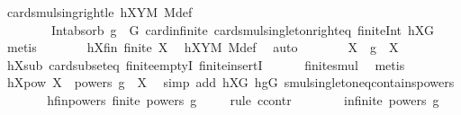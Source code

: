 \begin{isabellebody}
\ card{\isacharunderscore}{\kern0pt}smul{\isacharunderscore}{\kern0pt}sing{\isacharunderscore}{\kern0pt}right{\isacharunderscore}{\kern0pt}le\ hXYM\ M{\isacharunderscore}{\kern0pt}def\ \isanewline
\ \ \ \ \ \ \ \ Int{\isacharunderscore}{\kern0pt}absorb{}\ {\isacartoucheopen}g\ {\isasymin}\ G{\isacartoucheclose}\ card{\isachardot}{\kern0pt}infinite\ card{\isacharunderscore}{\kern0pt}smul{\isacharunderscore}{\kern0pt}singleton{\isacharunderscore}{\kern0pt}right{\isacharunderscore}{\kern0pt}eq\ finite{\isacharunderscore}{\kern0pt}Int\ hXG\ \isamarkupfalse%
\ metis\isanewline
\ \ \ \ \isamarkupfalse%
\ \isamarkupfalse%
\ hXfin{\isacharcolon}{\kern0pt}\ {\isachardoublequoteopen}finite\ X{\isachardoublequoteclose}\ \isamarkupfalse%
\ hXYM\ M{\isacharunderscore}{\kern0pt}def\ \isamarkupfalse%
\ auto\isanewline
\ \ \ \ \isamarkupfalse%
\ \isamarkupfalse%
\ {\isachardoublequoteopen}X\ {\isasymcdots}\ {\isacharbraceleft}{\kern0pt}g{\isacharbraceright}{\kern0pt}\ {\isacharequal}{\kern0pt}\ X{\isachardoublequoteclose}\ \isamarkupfalse%
\ hXsub\ card{\isacharunderscore}{\kern0pt}subset{\isacharunderscore}{\kern0pt}eq\ finite{\isachardot}{\kern0pt}emptyI\ finite{\isachardot}{\kern0pt}insertI\isanewline
\ \ \ \ \ \ finite{\isacharunderscore}{\kern0pt}smul\ \isamarkupfalse%
\ metis\isanewline
\ \ \ \ \isamarkupfalse%
\ \isamarkupfalse%
\ hXpow{\isacharcolon}{\kern0pt}\ {\isachardoublequoteopen}X\ {\isasymcdots}\ {\isacharparenleft}{\kern0pt}powers\ g{\isacharparenright}{\kern0pt}\ {\isacharequal}{\kern0pt}\ X{\isachardoublequoteclose}\ \isamarkupfalse%
\ {\isacharparenleft}{\kern0pt}simp\ add{\isacharcolon}{\kern0pt}\ hXG\ hgG\ smul{\isacharunderscore}{\kern0pt}singleton{\isacharunderscore}{\kern0pt}eq{\isacharunderscore}{\kern0pt}contains{\isacharunderscore}{\kern0pt}powers{\isacharparenright}{\kern0pt}\isanewline
\ \ \ \ \isamarkupfalse%
\ \isamarkupfalse%
\ hfinpowers{\isacharcolon}{\kern0pt}\ {\isachardoublequoteopen}finite\ {\isacharparenleft}{\kern0pt}powers\ g{\isacharparenright}{\kern0pt}{\isachardoublequoteclose}\isanewline
\ \ \ \ \isamarkupfalse%
{\isacharparenleft}{\kern0pt}rule\ ccontr{\isacharparenright}{\kern0pt}\isanewline
\ \ \ \ \ \ \isamarkupfalse%
\ {\isachardoublequoteopen}infinite\ {\isacharparenleft}{\kern0pt}powers\ g{\isacharparenright}{\kern0pt}{\isachardoublequoteclose}\isanewline

\end{isabellebody}
